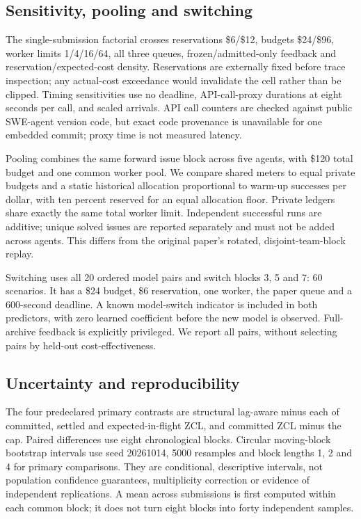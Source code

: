 \documentclass[11pt]{article}
\begin{document}
\subsection{Sensitivity, pooling and switching}
The single-submission factorial crosses reservations \$6/\$12, budgets \$24/\$96, worker limits 1/4/16/64, all three queues, frozen/admitted-only feedback and reservation/expected-cost density. Reservations are externally fixed before trace inspection; any actual-cost exceedance would invalidate the cell rather than be clipped. Timing sensitivities use no deadline, API-call-proxy durations at eight seconds per call, and scaled arrivals. API call counters are checked against public SWE-agent version code, but exact code provenance is unavailable for one embedded commit; proxy time is not measured latency.

Pooling combines the same forward issue block across five agents, with \$120 total budget and one common worker pool. We compare shared meters to equal private budgets and a static historical allocation proportional to warm-up successes per dollar, with ten percent reserved for an equal allocation floor. Private ledgers share exactly the same total worker limit. Independent successful runs are additive; unique solved issues are reported separately and must not be added across agents. This differs from the original paper's rotated, disjoint-team-block replay.

Switching uses all 20 ordered model pairs and switch blocks 3, 5 and 7: 60 scenarios. It has a \$24 budget, \$6 reservation, one worker, the paper queue and a 600-second deadline. A known model-switch indicator is included in both predictors, with zero learned coefficient before the new model is observed. Full-archive feedback is explicitly privileged. We report all pairs, without selecting pairs by held-out cost-effectiveness.

\subsection{Uncertainty and reproducibility}
The four predeclared primary contrasts are structural lag-aware minus each of committed, settled and expected-in-flight ZCL, and committed ZCL minus the cap. Paired differences use eight chronological blocks. Circular moving-block bootstrap intervals use seed 20261014, 5000 resamples and block lengths 1, 2 and 4 for primary comparisons. They are conditional, descriptive intervals, not population confidence guarantees, multiplicity correction or evidence of independent replications. A mean across submissions is first computed within each common block; it does not turn eight blocks into forty independent samples.
\end{document}
